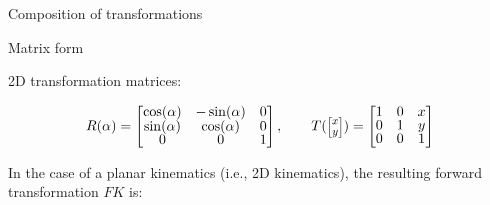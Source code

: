 \documentclass[compress]{beamer}
\newcommand{\colvec}[2][.8]{%
  \scalebox{#1}{%
    \renewcommand{\arraystretch}{.8}%
    $\begin{bmatrix}#2\end{bmatrix}$%
  }
}
\begin{document}
\begin{frame}{Composition of transformations}
\begin{tikzpicture}
    \end{tikzpicture}


\end{frame}
\begin{frame}{Matrix form}

    \footnotesize
    2D transformation matrices:

    \begin{align*}
        R(\alpha) = \begin{bmatrix}\cos(\alpha) & -\sin(\alpha) & 0 \\
                                   \sin(\alpha) & \cos(\alpha) & 0 \\
                                   0 &0 &1 \end{bmatrix}, \qquad
        T(\colvec{x \\y}) =  \begin{bmatrix} 1 & 0 & x \\
                                             0 & 1 & y \\
                                             0 & 0 & 1 \end{bmatrix}
    \end{align*}

    \pause

    In the case of a planar kinematics (i.e., 2D kinematics), the resulting forward transformation $FK$ is:


\end{frame}
\end{document}
